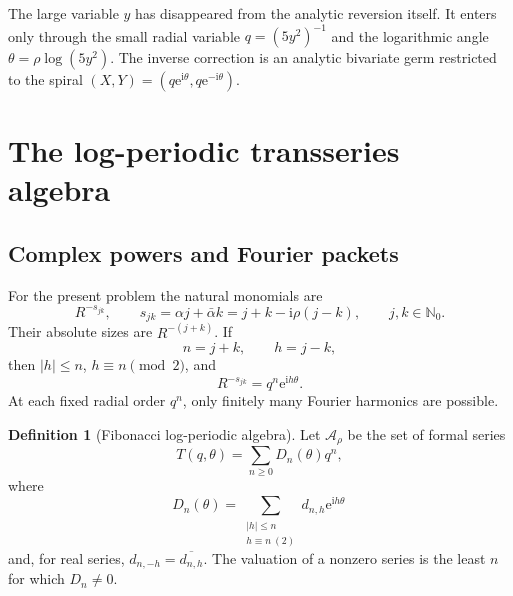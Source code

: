 \documentclass[11pt,oneside]{article}
\numberwithin{equation}{section}
\theoremstyle{plain}
\theoremstyle{definition}
\newtheorem{definition}[theorem]{Definition}
\theoremstyle{remark}
\newcommand{\e}{\mathrm e}
\newcommand{\ii}{\mathrm i}
\newcommand{\Nzero}{\mathbb N_0}
\newcommand{\Talg}{\mathscr A_{\rho}}
\begin{document}
\begin{checkpointbox}
The large variable \(y\) has disappeared from the analytic reversion itself.
It enters only through the small radial variable \(q=(5y^2)^{-1}\) and the
logarithmic angle \(\theta=\rho\log(5y^2)\).  The inverse correction is an
analytic bivariate germ restricted to the spiral
\((X,Y)=(q\e^{\ii\theta},q\e^{-\ii\theta})\).
\end{checkpointbox}

\section{The log-periodic transseries algebra}\label{sec:algebra}

\subsection{Complex powers and Fourier packets}

For the present problem the natural monomials are
\begin{equation}\label{eq:monomial-R}
 R^{-s_{jk}},
 \qquad
 s_{jk}=\alpha j+\bar\alpha k
       =j+k-\ii\rho(j-k),
 \qquad j,k\in\Nzero.
\end{equation}
Their absolute sizes are \(R^{-(j+k)}\).  If
\begin{equation}\label{eq:n-h}
 n=j+k,
 \qquad h=j-k,
\end{equation}
then \(|h|\le n\), \(h\equiv n\pmod2\), and
\begin{equation}\label{eq:monomial-qtheta}
 R^{-s_{jk}}=q^n\e^{\ii h\theta}.
\end{equation}
At each fixed radial order \(q^n\), only finitely many Fourier harmonics are
possible.

\begin{definition}[Fibonacci log-periodic algebra]\label{def:Talg}
Let \(\Talg\) be the set of formal series
\begin{equation}\label{eq:Talg-form}
 T(q,\theta)=\sum_{n\ge0}D_n(\theta)q^n,
\end{equation}
where
\begin{equation}\label{eq:Dn-cone}
 D_n(\theta)=
 \sum_{\substack{|h|\le n\\h\equiv n\ (2)}}d_{n,h}\e^{\ii h\theta}
\,
\end{equation}
and, for real series, \(d_{n,-h}=\overline{d_{n,h}}\).  The valuation of a
nonzero series is the least \(n\) for which \(D_n\ne0\).
\end{definition}
\end{document}
